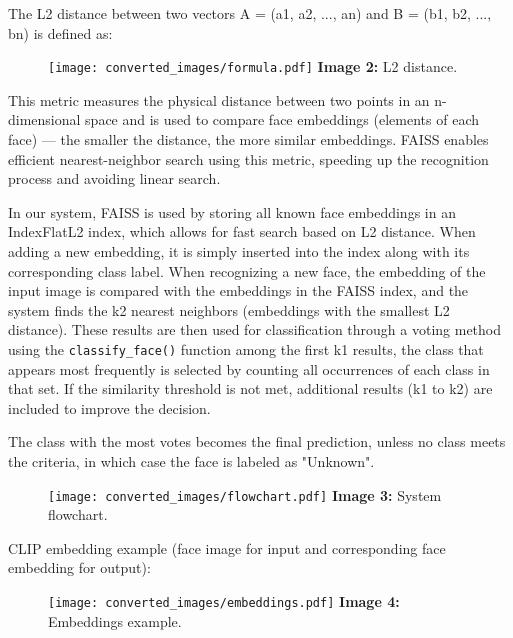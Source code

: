 \documentclass{article}
\begin{document}
The L2 distance between two vectors A = (a1, a2, ..., an) and B = (b1, b2, ..., bn) is defined as:

\begin{figure}[H]
    \centering
    \texttt{[image: converted\_images/formula.pdf]}
    \textbf{Image 2:} L2 distance.
\end{figure}

\hspace*{1.00cm}This metric measures the physical distance between two points in an n-dimensional space and is used to compare face embeddings (elements of each face) — the smaller the distance, the more similar embeddings. FAISS enables efficient nearest-neighbor search using this metric, speeding up the recognition process and avoiding linear search.

\hspace*{1.00cm}In our system, FAISS is used by storing all known face embeddings in an IndexFlatL2 index, which allows for fast search based on L2 distance. When adding a new embedding, it is simply inserted into the index along with its corresponding class label. When recognizing a new face, the embedding of the input image is compared with the embeddings in the FAISS index, and the system finds the k2 nearest neighbors (embeddings with the smallest L2 distance). These results are then used for classification through a voting method using the \texttt{classify\_face()} function among the first k1 results, the class that appears most frequently is selected by counting all occurrences of each class in that set. If the similarity threshold is not met, additional results (k1 to k2) are included to improve the decision.

The class with the most votes becomes the final prediction, unless no class meets the criteria, in which case the face is labeled as "Unknown".

\begin{figure}[H]
    \centering
    \texttt{[image: converted\_images/flowchart.pdf]}
    \textbf{Image 3:} System flowchart.
\end{figure}

CLIP embedding example (face image for input and corresponding face embedding for output):
\begin{figure}[H]
    \centering
    \texttt{[image: converted\_images/embeddings.pdf]}
    \textbf{Image 4:} Embeddings example.
\end{figure}
\end{document}
